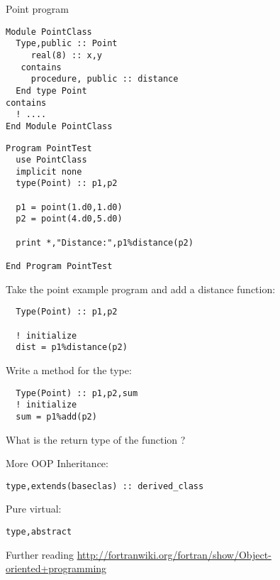 \begin{block}{Point program}
  \label{sl:fpoint-program}
  \footnotesize
  
  \begin{multicols}{2}
\begin{lstlisting}
Module PointClass
  Type,public :: Point
     real(8) :: x,y
   contains
     procedure, public :: distance
  End type Point
contains
  ! ....
End Module PointClass
\end{lstlisting}
\columnbreak
\begin{lstlisting}
Program PointTest
  use PointClass
  implicit none
  type(Point) :: p1,p2

  p1 = point(1.d0,1.d0)
  p2 = point(4.d0,5.d0)

  print *,"Distance:",p1%distance(p2)

End Program PointTest
\end{lstlisting}
  \end{multicols}  
\end{block}

\begin{exercise}
  \label{ex:fclass-point-distance}
  Take the point example program and add a distance function:
\begin{lstlisting}
  Type(Point) :: p1,p2
  
  ! initialize
  dist = p1%distance(p2)
\end{lstlisting}
\end{exercise}

\begin{exercise}
  \label{ex:fclass-translate}
  Write a method  for the  type:
\begin{lstlisting}
  Type(Point) :: p1,p2,sum
  ! initialize
  sum = p1%add(p2)
\end{lstlisting}
  What is the return type of the function ?
\end{exercise}

\begin{block}{More OOP}
  \label{sl:oopf}
Inheritance:
\begin{lstlisting}
type,extends(baseclas) :: derived_class
\end{lstlisting}
Pure virtual:
\begin{lstlisting}
type,abstract
\end{lstlisting}
\end{block}

\begin{block}{Further reading}
  \url{http://fortranwiki.org/fortran/show/Object-oriented+programming}
\end{block}

\endinput

\begin{block}{Use modules!}
  \label{sl:fclass-module}
   It is of course best to put the type definition and method
   definitions in a module, so that you can \n{use} it.

   Mark methods as \n{private} so that they can only be used as part
   of the \n{type}:

   \verbatimsnippet{classmodule}
\end{block}

